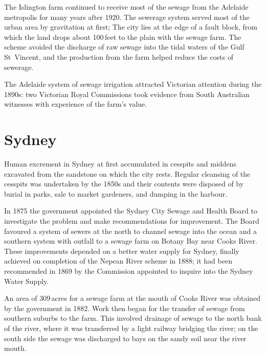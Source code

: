 The Islington farm continued to receive most of the sewage from the
Adelaide metropolis for many years after 1920.  The sewerage system
served most of the urban area by gravitation at first; The city lies
at the edge of a fault block, from which the land drops about
100\,feet to the plain with the sewage farm.  The scheme avoided the
discharge of raw sewage into the tidal waters of the Gulf St~Vincent,
 and the production from the farm helped
reduce the costs of sewerage.

The Adelaide system of sewage irrigation attracted Victorian attention
during the 1890s: two Victorian Royal Commissions took evidence from
South Australian witnesses with experience of the farm's
value.

\section*{Sydney}

Human excrement in Sydney at first accumulated in cesspits and middens
excavated from the sandstone on which the city rests.  Regular
cleansing of the cesspits was undertaken by the 1850s and their
contents were disposed of by burial in parks, sale to market
gardeners, and dumping in the
harbour.

In 1875 the government appointed the Sydney City Sewage and Hea\-l\-th
Board to investigate the problem and make recommendations for
improvement.  The Board favoured a system of sewers at the north to
channel sewage into the ocean and a southern system with outfall to a
sewage farm on Botany Bay near Cooks River.  These improvements
depended on a better water supply for Sydney, finally achieved on
completion of the Nepean River  scheme in 1888; it
had been recommended in 1869 by the Commission appointed to inquire
into the Sydney Water Supply.

An area of 309\,acres for a sewage farm at the mouth of Cooks River
  was obtained
by the government in 1882.  Work then began for the transfer of sewage
from southern suburbs to the farm.  This involved
drainage of sewage to the north bank of the river,
where it was transferred by a light railway bridging
the river; on the south side the sewage was discharged to bays on the
sandy soil near the river mouth.

